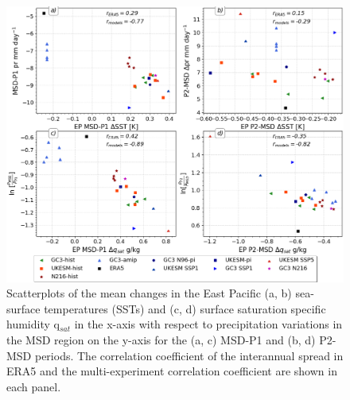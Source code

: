\begin{figure}[t!]
\includegraphics[width=\linewidth]{figures/sst_scatter_f.png}
\caption{Scatterplots of the mean changes in the East Pacific (a, b) sea-surface temperatures (SSTs) and (c, d) surface saturation specific humidity q$_{sat}$ in the x-axis with respect to precipitation variations in the MSD region on the y-axis for the (a, c) MSD-P1 and (b, d) P2-MSD periods.  The correlation coefficient of the interannual spread in ERA5 and the multi-experiment correlation coefficient are shown in each panel.   }
\label{fig:var_sst_lhf_scatter}
\end{figure}


